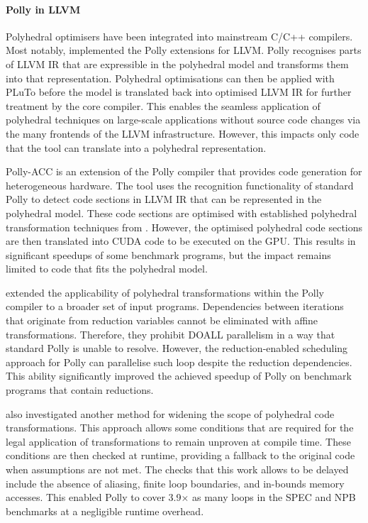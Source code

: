    \paragraph*{Polly in LLVM}
    Polyhedral optimisers have been integrated into mainstream C/C++ compilers.
    Most notably, \citet{Lengauer2012Polly} implemented the Polly extensions for
    LLVM.
    Polly recognises parts of LLVM IR that are expressible in the polyhedral
    model and transforms them into that representation.
    Polyhedral optimisations can then be applied with PLuTo
    \citep{Bondhugula:2008:PAP:1375581.1375595} before the model is
    translated back into optimised LLVM IR for further treatment by the core
    compiler.
    This enables the seamless application of polyhedral techniques on
    large-scale applications without source code changes via the many
    frontends of the LLVM infrastructure.
    However, this impacts only code that the tool can translate
    into a polyhedral representation.

    Polly-ACC \citep{polly-acc} is an extension of the Polly compiler that
    provides code generation for heterogeneous hardware.
    The tool uses the recognition functionality of standard Polly to detect
    code sections in LLVM IR that can be represented in the polyhedral model.
    These code sections are optimised with established polyhedral
    transformation techniques from \citet{Lengauer2012Polly}.
    However, the optimised polyhedral code sections are then translated into
    CUDA code to be executed on the GPU.
    This results in significant speedups of some benchmark programs, but the
    impact remains limited to code that fits the polyhedral model.

    \citet{Doerfert2015Polly} extended the applicability of polyhedral
    transformations within the Polly compiler to a broader set of input
    programs.
    Dependencies between iterations that originate from reduction variables
    cannot be eliminated with affine transformations.
    Therefore, they prohibit DOALL parallelism in a way that standard Polly is
    unable to resolve.
    However, the reduction-enabled scheduling approach for Polly can parallelise
    such loop despite the reduction dependencies.
    This ability significantly improved the achieved speedup of Polly on
    benchmark programs that contain reductions.

    \citet{Doerfert:2017:OLO:3049832.3049864} also investigated another method
    for widening the scope of polyhedral code transformations.
    This approach allows some conditions that are required for the legal
    application of transformations to remain unproven at compile time.
    These conditions are then checked at runtime, providing a fallback to the
    original code when assumptions are not met.
    The checks that this work allows to be delayed include the absence of
    aliasing, finite loop boundaries, and in-bounds memory accesses.
    This enabled Polly to cover 3.9$\times$ as many loops in the SPEC and NPB
    benchmarks at a negligible runtime overhead.

